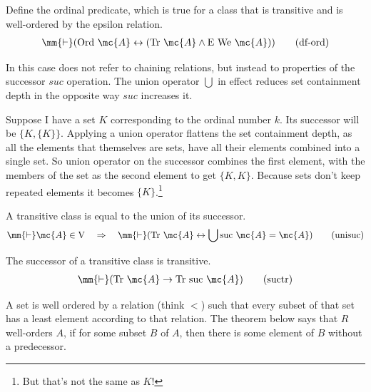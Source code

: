 \begin{metadefinition} Define the ordinal predicate, which is
true for a class that is transitive
     and is well-ordered by the epsilon relation. 
\begin{align}
\mm{\vdash} ( {\rm Ord}~ \mc{A} \leftrightarrow ( {\rm Tr}~ \mc{A} \wedge {\rm E}
    ~{\rm We}~ \mc{A} ) )\label{eq:df-ord}\tag{df-ord}
\end{align}
\end{metadefinition}


In this case  does not refer to chaining relations, but instead to properties of the successor $suc$ operation.  The union operator $\bigcup$ in effect reduces set containment depth in the opposite way $suc$ increases it.

Suppose I have a set $K$ corresponding to the ordinal number $k$. Its successor will be $\{ K , \{ K \} \}$.  Applying a union operator flattens the set containment depth, as all the elements that themselves are sets, have all their elements combined into a single set.  So union operator on the successor combines the first element, with the members of the set as the second element to get $\{ K , K \}$.   Because sets don't keep repeated elements it becomes $\{ K \}$.\footnote{But that's not the same as $K$!}

\begin{lemma} A transitive class is equal to the union of
its successor.  
\begin{align}
\mm{\vdash} \mc{A} \in {\rm V}\quad\Rightarrow\quad \mm{\vdash} ( {\rm Tr}~
    \mc{A} \leftrightarrow \bigcup {\rm suc}~\mc{A} = \mc{A}
    )\label{eq:unisuc}\tag{unisuc}
\end{align}
\end{lemma}

\begin{lemma} The successor of a transitive class is
transitive.  
\begin{align}
\mm{\vdash} ( {\rm Tr}~\mc{A} \rightarrow {\rm Tr}~{\rm suc}~\mc{A}
    )\label{eq:suctr}\tag{suctr}
\end{align}
\end{lemma}


A set is well ordered by a relation (think $<$) such that every subset of that set has a least element according to that relation.
The theorem below says that $R$ well-orders $A$, if for some subset $B$ of $A$, then there is some element of $B$ without a predecessor.


